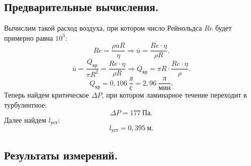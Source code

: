 \documentclass[a4paper,11pt]{article}
\begin{document}
\subsection{Предварительные вычисления.}
Вычислим такой расход воздуха, при котором число Рейнольдса $Re$ будет примерно равна $10^{3}$:
$$ Re = \frac{\rho \overline{u} R}{\eta} \Rightarrow \overline{u} = \frac{Re \cdot \eta}{\rho R}.$$
$$ \overline{u} = \frac{Q_{кр}}{\pi R^{2}} = \frac{Re \cdot \eta}{\rho R} \Rightarrow Q_{кр} = \pi R \cdot \frac{Re \cdot \eta}{\rho}.$$
$$Q_{кр} = 0,106\ \frac{л}{с} = 2,96\ \frac{л}{мин}.$$
Теперь найдем критическое $\Delta P$, при котором ламинарное течение переходит в турбулентное:
$$\Delta P = 177\ Па.$$
Далее найдем $l_{уст}$:
$$l_{уст} = 0,395\ м.$$
\subsection{Результаты измерений.} %
\end{document}

